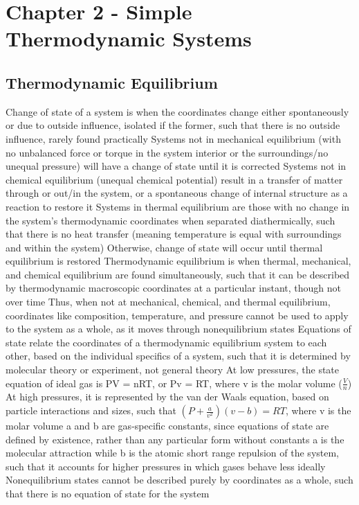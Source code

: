 \documentclass[11 pt, twoside]{article}
\newenvironment{outline*}
{
	\begin{outline}[enumerate]
	}
	{\end{outline}
}
\begin{document}
\section{Chapter 2 - Simple Thermodynamic Systems}
\subsection{Thermodynamic Equilibrium}
\begin{outline*}
\1 Change of state of a system is when the coordinates change either spontaneously or due to outside influence, isolated if the former, such that there is no outside influence, rarely found practically
\2 Systems not in mechanical equilibrium (with no unbalanced force or torque in the system interior or the surroundings/no unequal pressure) will have a change of state until it is corrected
\2 Systems not in chemical equilibrium (unequal chemical potential) result in a transfer of matter through or out/in the system, or a spontaneous change of internal structure as a reaction to restore it
\2 Systems in thermal equilibrium are those with no change in the system's thermodynamic coordinates when separated diathermically, such that there is no heat transfer (meaning temperature is equal with surroundings and within the system)
\3 Otherwise, change of state will occur until thermal equilibrium is restored
\1 Thermodynamic equilibrium is when thermal, mechanical, and chemical equilibrium are found simultaneously, such that it can be described by thermodynamic macroscopic coordinates at a particular instant, though not over time
\2 Thus, when not at mechanical, chemical, and thermal equilibrium, coordinates like composition, temperature, and pressure cannot be used to apply to the system as a whole, as it moves through nonequilibrium states
\1 Equations of state relate the coordinates of a thermodynamic equilibrium system to each other, based on the individual specifics of a system, such that it is determined by molecular theory or experiment, not general theory
\2 At low pressures, the state equation of ideal gas is PV = nRT, or Pv = RT, where v is the molar volume ($\frac{V}{n}$)
\2 At high pressures, it is represented by the van der Waals equation, based on particle interactions and sizes, such that $(P + \frac{a}{v^2})(v - b) = RT$, where v is the molar volume
\3 a and b are gas-specific constants, since equations of state are defined by existence, rather than any particular form without constants
\3 a is the molecular attraction while b is the atomic short range repulsion of the system, such that it accounts for higher pressures in which gases behave less ideally 
\2 Nonequilibrium states cannot be described purely by coordinates as a whole, such that there is no equation of state for the system
\end{outline*}
\end{document}
